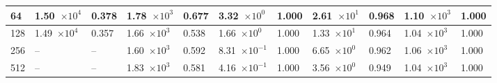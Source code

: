 \begin{table}[!t]
\begin{center}
\begin{small}
\begin{sc}
\begin{tabular}{|l|p{1.2cm}|p{0.8cm}|p{1.2cm}|p{0.8cm}|p{1.2cm}|p{0.8cm}|p{1.2cm}|p{0.8cm}|p{1.2cm}|p{0.8cm}|}
                    \hline
                    64  & 1.50~$\times10^{4}$ & 0.378 & 1.78~$\times10^{3}$ & 0.677 & 3.32~$\times10^{0}$  & 1.000 & 2.61~$\times10^{1}$ & 0.968  & 1.10~$\times10^{3}$ & 1.000 \\
                    \hline
                    128 & 1.49~$\times10^{4}$ & 0.357 & 1.66~$\times10^{3}$ & 0.538 & 1.66~$\times10^{0}$  & 1.000 & 1.33~$\times10^{1}$ & 0.964  & 1.04~$\times10^{3}$ & 1.000 \\
                    \hline
                    256 & --                  & --    & 1.60~$\times10^{3}$ & 0.592 & 8.31~$\times10^{-1}$ & 1.000 & 6.65~$\times10^{0}$ & 0.962  & 1.06~$\times10^{3}$ & 1.000 \\
                    \hline
                    512 & --                  & --    & 1.83~$\times10^{3}$ & 0.581 & 4.16~$\times10^{-1}$ & 1.000 & 3.56~$\times10^{0}$ & 0.949  & 1.04~$\times10^{3}$ & 1.000 \\
                    \hline
                \end{tabular}
            \end{sc}
        \end{small}
    \end{center}
    \vskip -0.1in
\end{table}


